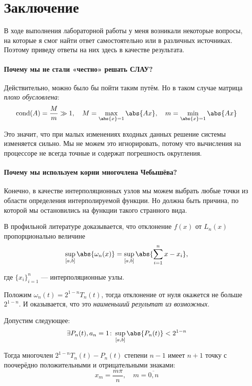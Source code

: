 \section{Заключение}

В ходе выполнения лабораторной работы у меня возникали некоторые вопросы, на которые я смог найти ответ самостоятельно или в различных источниках. Поэтому приведу ответы на них здесь в качестве результата.

\paragraph{Почему мы не стали «честно» решать СЛАУ?}

Действительно, можно было бы пойти таким путём. Но в таком случае матрица \textit{плохо обусловлена}:
\[
  \mathrm{cond}(A)=\dfrac{M}{m}\gg 1,\quad M=\max_{\abs{x}=1}\abs{Ax},\quad m=\min_{\abs{x}=1}\abs{Ax}
\]

Это значит, что при малых изменениях входных данных решение системы изменяется сильно. Мы не можем это игнорировать, потому что вычисления на процессоре не всегда точные и содержат погрешность округления.

\paragraph{Почему мы используем корни многочлена Чебышёва?}

Конечно, в качестве интерполяционных узлов мы можем выбрать любые точки из области определения интерполируемой функции. Но должна быть причина, по которой мы остановились на функции такого странного вида.

В профильной литературе доказывается, что отклонение \( f(x) \) от \( L_n(x) \) пропорционально величине
\[
  \sup_{[a,b]}\abs{\omega_n(x)}=\sup_{[a,b]}\abs{\sum_{i=1}^n x-x_i},
\]

где \( \{x_i\}_{i=1}^n \) --- интерполяционные узлы.

Положим \( \omega_n(t)=2^{1-n}T_n(t) \), тогда отклонение от нуля окажется не больше \( 2^{1-n} \). И оказывается, что это \textit{наименьший результат из возможных}.

Допустим следующее:
\[
  \exists P_n(t), a_n=1\colon\sup_{[a,b]}\abs{P_n(t)}<2^{1-n}
\]

Тогда многочлен \( 2^{1-n}T_n(t)-P_n(t) \) степени \( n-1 \) имеет \(n+1\) точку с поочерёдно положительными и отрицательными знаками:
\[
  x_m=\dfrac{m\pi}{n},\quad m=\overline{0,n}
\]

